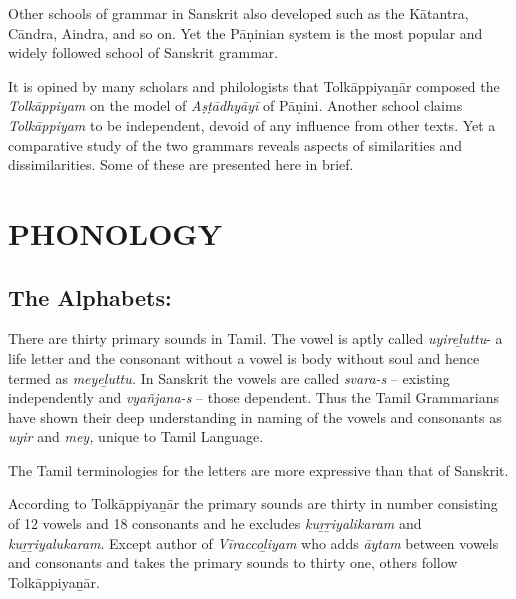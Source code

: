 Other schools of grammar in Sanskrit also developed such as the Kātantra, Cāndra, Aindra, and so on. Yet the Pāṇinian system is the most popular and widely followed school of Sanskrit grammar.

It is opined by many scholars and philologists that Tolkāppiyaṉār composed the \textit{Tolkāppiyam} on the model of \textit{Aṣṭādhyāyī} of Pāṇini. Another school claims \textit{Tolkāppiyam} to be independent, devoid of any influence from other texts. Yet a comparative study of the two grammars reveals aspects of similarities and dissimilarities. Some of these are presented here in brief.


\section*{PHONOLOGY}

\subsection*{The Alphabets:}

There are thirty primary sounds in Tamil. The vowel is aptly called \textit{uyireḻuttu}- a life letter and the consonant without a vowel is body without soul and hence termed as \textit{meyeḻuttu.} In Sanskrit the vowels are called \textit{svara-s} – existing independently and \textit{vyañjana-s} – those dependent. Thus the Tamil Grammarians have shown their deep understanding in naming of the vowels and consonants as \textit{uyir} and \textit{mey,} unique to Tamil Language.

The Tamil terminologies for the letters are more expressive than that of Sanskrit.

According to Tolkāppiyaṉār the primary sounds are thirty in number consisting of 12 vowels and 18 consonants and he excludes \textit{kuṟṟiyalikaram} and\textit{ kuṟṟiyalukaram}. Except author of \textit{Vīraccoḻiyam} who adds \textit{āytam} between vowels and consonants and takes the primary sounds to thirty one, others follow Tolkāppiyaṉār.

